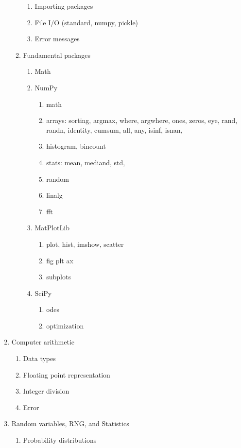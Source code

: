 \documentclass{article}
\begin{document}
\begin{multicols}{2}
\begin{enumerate}
\begin{enumerate}
\begin{enumerate}
			\item Importing packages
			\item File I/O (standard, numpy, pickle)		
			\item Error messages
		\end{enumerate}
		\item Fundamental packages
		\begin{enumerate}
			\item Math
			\item NumPy
			\begin{enumerate}
				\item math
				\item arrays: sorting, argmax, where, argwhere, ones, zeros, eye, rand, randn, identity, cumsum, all, any, isinf, isnan, 
				\item histogram, bincount
				\item stats: mean, mediand, std, 
				\item random
				\item linalg
				\item fft
			\end{enumerate}
			\item MatPlotLib
			\begin{enumerate}
				\item plot, hist, imshow, scatter
				\item fig plt ax
				\item subplots
			\end{enumerate}
			\item SciPy
			\begin{enumerate}
				\item odes
				\item optimization
			\end{enumerate}
		\end{enumerate}
	\end{enumerate}	
	\item Computer arithmetic
	\begin{enumerate}
		\item Data types
		\item Floating point representation
		\item Integer division
		\item Error
	\end{enumerate}
	\item Random variables, RNG, and Statistics
	\begin{enumerate}
		\item Probability distributions

\end{enumerate}
\end{enumerate}
\end{multicols}
\end{document}

